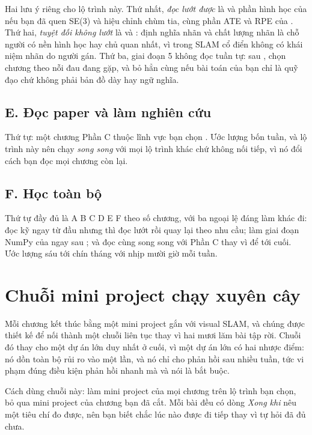 \documentclass[../../deep_learning.tex]{subfiles}
\begin{document}
Hai lưu ý riêng cho lộ trình này. Thứ nhất, \emph{đọc lướt được} là  và phần hình học của  nếu bạn đã quen SE(3) và hiệu chỉnh chùm tia, cùng phần ATE và RPE của . Thứ hai, \emph{tuyệt đối không lướt} là  và : định nghĩa nhãn và chất lượng nhãn là chỗ người có nền hình học hay chủ quan nhất, vì trong SLAM cổ điển không có khái niệm nhãn do người gán. Thứ ba, giai đoạn 5 không đọc tuần tự: sau , chọn chương theo nỗi đau đang gặp, và bỏ hẳn  cùng  nếu bài toán của bạn chỉ là quỹ đạo chứ không phải bản đồ dày hay ngữ nghĩa.

\subsection{E. Đọc paper và làm nghiên cứu}

Thứ tự:  \ra {} \ra {} \ra {} \ra một chương Phần C thuộc lĩnh vực bạn chọn \ra {}. Ước lượng bốn tuần, và lộ trình này nên chạy \emph{song song} với mọi lộ trình khác chứ không nối tiếp, vì nó đổi cách bạn đọc mọi chương còn lại.

\subsection{F. Học toàn bộ}

Thứ tự đầy đủ là A \ra B \ra C \ra D \ra E \ra F theo số chương, với ba ngoại lệ đáng làm khác đi: đọc  kỹ ngay từ đầu nhưng  thì đọc lướt rồi quay lại theo nhu cầu; làm giai đoạn NumPy của  ngay sau ; và đọc  cùng  song song với Phần C thay vì để tới cuối. Ước lượng sáu tới chín tháng với nhịp mười giờ mỗi tuần.

\section{Chuỗi mini project chạy xuyên cây}

Mỗi chương kết thúc bằng một mini project gắn với visual SLAM, và chúng được thiết kế để nối thành một chuỗi liên tục thay vì hai mươi lăm bài tập rời. Chuỗi đó thay cho một dự án lớn duy nhất ở cuối, vì một dự án lớn có hai nhược điểm: nó dồn toàn bộ rủi ro vào một lần, và nó chỉ cho phản hồi sau nhiều tuần, tức vi phạm đúng điều kiện phản hồi nhanh mà  và  nói là bắt buộc.

Cách dùng chuỗi này: làm mini project của mọi chương trên lộ trình bạn chọn, bỏ qua mini project của chương bạn đã cắt. Mỗi bài đều có dòng \emph{Xong khi} nêu một tiêu chí đo được, nên bạn biết chắc lúc nào được đi tiếp thay vì tự hỏi đã đủ chưa.
\end{document}
